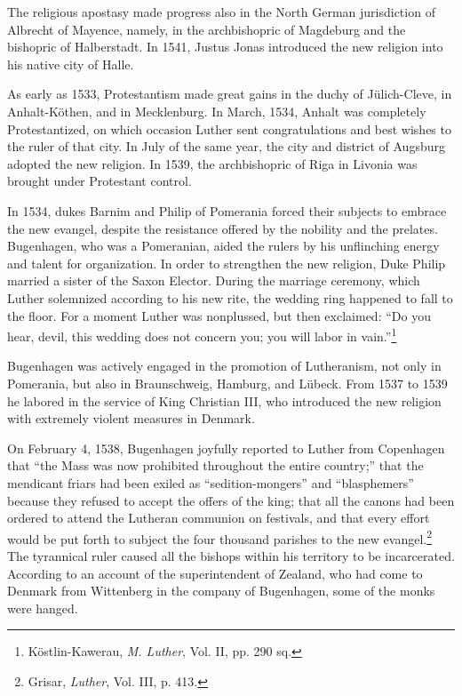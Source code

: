 The religious apostasy made progress also in the North German
jurisdiction of Albrecht of Mayence, namely, in the archbishopric of
Magdeburg and the bishopric of Halberstadt. In 1541, Justus Jonas
introduced the new religion into his native city of Halle.

As early as 1533, Protestantism made great gains in the duchy of
Jülich-Cleve, in Anhalt-Köthen, and in Mecklenburg. In March,
1534, Anhalt was completely Protestantized, on which occasion Luther
sent congratulations and best wishes to the ruler of that city. In July
of the same year, the city and district of Augsburg adopted the new
religion. In 1539, the archbishopric of Riga in Livonia was brought
under Protestant control.

In 1534, dukes Barnim and Philip of Pomerania forced their subjects to
embrace the new evangel, despite the resistance offered by
the nobility and the prelates. Bugenhagen, who was a Pomeranian,
aided the rulers by his unflinching energy and talent for organization.
In order to strengthen the new religion, Duke Philip married a sister
of the Saxon Elector. During the marriage ceremony, which Luther
solemnized according to his new rite, the wedding ring happened to
fall to the floor. For a moment Luther was nonplussed, but then exclaimed:
“Do you hear, devil, this wedding does not concern you; you
will labor in vain.”\footnote{Köstlin-Kawerau, \textit{M. Luther}, Vol. II, pp. 290 sq.}


Bugenhagen was actively engaged in the promotion of Lutheranism,
not only in Pomerania, but also in Braunschweig, Hamburg, and
Lübeck. From 1537 to 1539 he labored in the service of King Christian
III, who introduced the new religion with extremely violent
measures in Denmark.

On February 4, 1538, Bugenhagen joyfully reported to Luther from
Copenhagen that “the Mass was now prohibited throughout the entire
country;” that the mendicant friars had been exiled as “sedition-mongers”
and “blasphemers” because they refused to accept the offers of the king;
that all the canons had been ordered to attend the Lutheran communion on
festivals, and that every effort would be put forth to subject the four
thousand parishes to the new evangel.\footnote{Grisar, \textit{Luther}, Vol. III, p. 413.}
 The tyrannical ruler caused all the
bishops within his territory to be incarcerated. According to an account of
the superintendent of Zealand, who had come to Denmark from Wittenberg
in the company of Bugenhagen, some of the monks were hanged.

